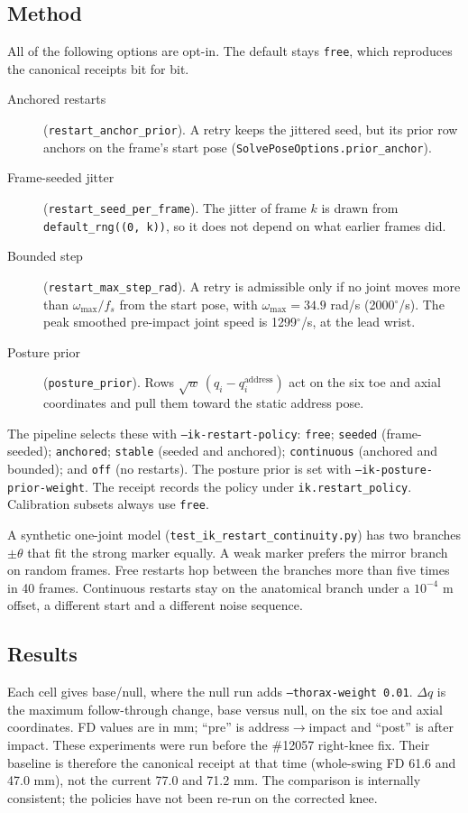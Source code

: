 \documentclass[11pt,a4paper]{article}
\begin{document}
\subsection{Method}
All of the following options are opt-in. The default stays \texttt{free},
which reproduces the canonical receipts bit for bit.
\begin{description}
\item[Anchored restarts] (\texttt{restart\_anchor\_prior}). A retry keeps the
jittered seed, but its prior row anchors on the frame's start pose
(\texttt{SolvePoseOptions.prior\_anchor}).
\item[Frame-seeded jitter] (\texttt{restart\_seed\_per\_frame}). The jitter of
frame $k$ is drawn from \texttt{default\_rng((0, k))}, so it does not depend on
what earlier frames did.
\item[Bounded step] (\texttt{restart\_max\_step\_rad}). A retry is admissible
only if no joint moves more than $\omega_\mathrm{max}/f_s$ from the start pose,
with $\omega_\mathrm{max}=34.9$ rad/s (2000$^\circ$/s). The peak smoothed
pre-impact joint speed is 1299$^\circ$/s, at the lead wrist.
\item[Posture prior] (\texttt{posture\_prior}). Rows
$\sqrt{w}\,(q_i - q_i^\mathrm{address})$ act on the six toe and axial
coordinates and pull them toward the static address pose.
\end{description}
The pipeline selects these with \texttt{--ik-restart-policy}:
\texttt{free}; \texttt{seeded} (frame-seeded); \texttt{anchored};
\texttt{stable} (seeded and anchored); \texttt{continuous} (anchored and
bounded); and \texttt{off} (no restarts). The posture prior is set with
\texttt{--ik-posture-prior-weight}. The receipt records the policy under
\texttt{ik.restart\_policy}. Calibration subsets always use \texttt{free}.

A synthetic one-joint model (\texttt{test\_ik\_restart\_continuity.py}) has
two branches $\pm\theta$ that fit the strong marker equally. A weak marker
prefers the mirror branch on random frames. Free restarts hop between the
branches more than five times in 40 frames. Continuous restarts stay on the
anatomical branch under a $10^{-4}$ m offset, a different start and a
different noise sequence.

\subsection{Results}
Each cell gives base/null, where the null run adds \texttt{--thorax-weight
0.01}. $\Delta q$ is the maximum follow-through change, base versus null, on
the six toe and axial coordinates. FD values are in mm; ``pre'' is
address$\to$impact and ``post'' is after impact. These experiments were run
before the \#12057 right-knee fix. Their baseline is therefore the canonical
receipt at that time (whole-swing FD 61.6 and 47.0 mm), not the current
77.0 and 71.2 mm. The comparison is internally consistent; the policies have
not been re-run on the corrected knee.
\end{document}
